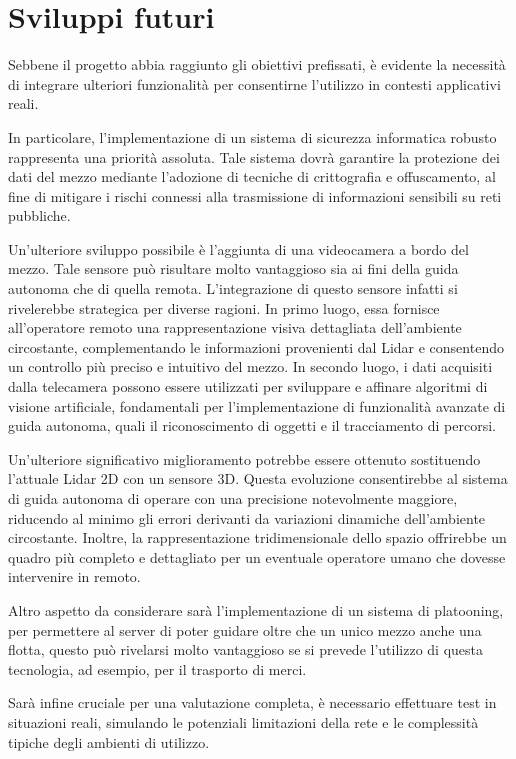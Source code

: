 \section{Sviluppi futuri}
Sebbene il progetto abbia raggiunto gli obiettivi prefissati, è evidente la necessità di integrare ulteriori funzionalità per consentirne l'utilizzo in contesti applicativi reali. 

\noindent In particolare, l'implementazione di un sistema di sicurezza informatica robusto rappresenta una priorità assoluta. Tale sistema dovrà garantire la protezione dei dati del mezzo mediante l'adozione di tecniche di crittografia e offuscamento, al fine di mitigare i rischi connessi alla trasmissione di informazioni sensibili su reti pubbliche.

\noindent Un'ulteriore sviluppo possibile è l'aggiunta di una videocamera a bordo del mezzo. Tale sensore può risultare molto vantaggioso sia ai fini della guida autonoma che di quella remota. L'integrazione di questo sensore infatti si rivelerebbe strategica per diverse ragioni. In primo luogo, essa fornisce all'operatore remoto una rappresentazione visiva dettagliata dell'ambiente circostante, complementando le informazioni provenienti dal Lidar e consentendo un controllo più preciso e intuitivo del mezzo. In secondo luogo, i dati acquisiti dalla telecamera possono essere utilizzati per sviluppare e affinare algoritmi di visione artificiale, fondamentali per l'implementazione di funzionalità avanzate di guida autonoma, quali il riconoscimento di oggetti e il tracciamento di percorsi. 

\noindent Un'ulteriore significativo miglioramento potrebbe essere ottenuto sostituendo l'attuale Lidar 2D con un sensore 3D. Questa evoluzione consentirebbe al sistema di guida autonoma di operare con una precisione notevolmente maggiore, riducendo al minimo gli errori derivanti da variazioni dinamiche dell'ambiente circostante. Inoltre, la rappresentazione tridimensionale dello spazio offrirebbe un quadro più completo e dettagliato per un eventuale operatore umano che dovesse intervenire in remoto.

\noindent Altro aspetto da considerare sarà l'implementazione di un sistema di platooning, per permettere al  server di poter guidare oltre che un unico mezzo anche una flotta, questo può rivelarsi molto vantaggioso se si prevede l'utilizzo di questa tecnologia, ad esempio, per il trasporto di merci.

\noindent Sarà infine cruciale per una valutazione completa, è necessario effettuare test in situazioni reali, simulando le potenziali limitazioni della rete e le complessità tipiche degli ambienti di utilizzo. 

